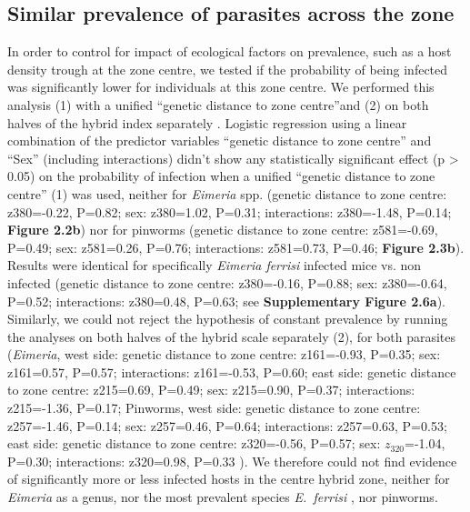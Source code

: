 \subsection{Similar prevalence of parasites across the zone}
In order to control for impact of ecological factors on prevalence, such as a host density trough at the zone centre, we tested if the probability of being infected was significantly lower for individuals at this zone centre. We performed this analysis (1) with a unified “genetic distance to zone centre”and (2) on both halves of the hybrid index separately . Logistic regression using a linear combination of the predictor variables “genetic distance to zone centre” and “Sex” (including interactions) didn’t show any statistically significant effect (p > 0.05) on the probability of infection when a unified “genetic distance to zone centre” (1) was used, neither for \textit{Eimeria} spp. (genetic distance to zone centre: z380=-0.22, P=0.82; sex: z380=1.02, P=0.31; interactions: z380=-1.48, P=0.14; \textbf{Figure 2.2b}) nor for pinworms (genetic distance to zone centre: z581=-0.69, P=0.49; sex: z581=0.26, P=0.76; interactions: z581=0.73, P=0.46; \textbf{Figure 2.3b}). Results were identical for specifically \textit{Eimeria ferrisi} infected mice vs. non infected (genetic distance to zone centre: z380=-0.16, P=0.88; sex: z380=-0.64, P=0.52; interactions: z380=0.48, P=0.63; see \textbf{Supplementary Figure 2.6a}). Similarly, we could not reject the hypothesis of constant prevalence by running the analyses on both halves of the hybrid scale separately (2), for both parasites (\textit{Eimeria}, west side: genetic distance to zone centre: z161=-0.93, P=0.35; sex: z161=0.57, P=0.57; interactions: z161=-0.53, P=0.60; east side: genetic distance to zone centre: z215=0.69, P=0.49; sex: z215=0.90, P=0.37; interactions: z215=-1.36, P=0.17; Pinworms, west side: genetic distance to zone centre: z257=-1.46, P=0.14; sex: z257=0.46, P=0.64; interactions: z257=0.63, P=0.53; east side: genetic distance to zone centre: z320=-0.56, P=0.57; sex: $z_320$=-1.04, P=0.30; interactions: z320=0.98, P=0.33 ). We therefore could not find evidence of significantly more or less infected hosts in the centre hybrid zone, neither for \textit{Eimeria} as a genus, nor the most prevalent species \textit{E.~ferrisi} , nor pinworms. 

